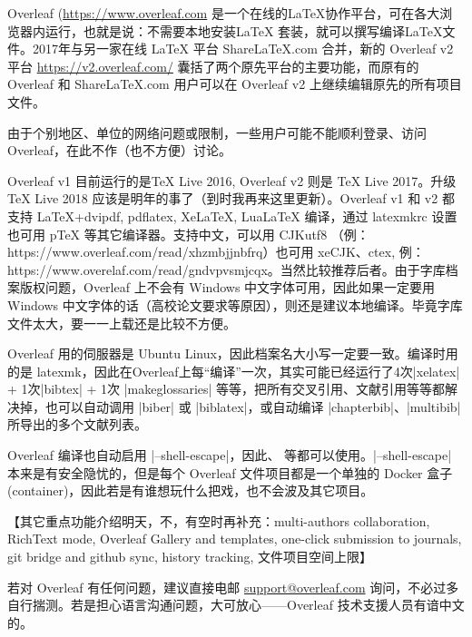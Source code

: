 


Overleaf (\url{https://www.overleaf.com} 是一个在线的LaTeX协作平台，可在各大浏览器内运行，也就是说：不需要本地安装LaTeX 套装，就可以撰写编译LaTeX文件。2017年与另一家在线 LaTeX 平台 ShareLaTeX.com 合并，新的 Overleaf v2 平台 \url{https://v2.overleaf.com/} 囊括了两个原先平台的主要功能，而原有的 Overleaf 和 ShareLaTeX.com 用户可以在 Overleaf v2 上继续编辑原先的所有项目文件。

由于个别地区、单位的网络问题或限制，一些用户可能不能顺利登录、访问 Overleaf，在此不作（也不方便）讨论。

Overleaf v1 目前运行的是TeX Live 2016, Overleaf v2 则是 TeX Live 2017。升级 TeX Live 2018 应该是明年的事了（到时我再来这里更新）。Overleaf v1 和 v2 都支持 LaTeX+dvipdf, pdflatex, XeLaTeX, LuaLaTeX 编译，通过 latexmkrc 设置也可用 pTeX 等其它编译器。支持中文，可以用 CJKutf8 （例：https://www.overleaf.com/read/xhzmbjjnbfrq）也可用 xeCJK、ctex, 例：https://www.overelaf.com/read/gndvpvsmjcqx。当然比较推荐后者。由于字库档案版权问题，Overleaf 上不会有 Windows 中文字体可用，因此如果一定要用 Windows 中文字体的话（高校论文要求等原因），则还是建议本地编译。毕竟字库文件太大，要一一上载还是比较不方便。

Overleaf 用的伺服器是 Ubuntu Linux，因此档案名大小写一定要一致。编译时用的是 latexmk，因此在Overleaf上每“编译”一次，其实可能已经运行了4次|xelatex| + 1次|bibtex| + 1次 |makeglossaries| 等等，把所有交叉引用、文献引用等等都解决掉，也可以自动调用 |biber| 或 |biblatex|，或自动编译 |chapterbib|、|multibib| 所导出的多个文献列表。

Overleaf 编译也自动启用 |--shell-escape|，因此、 等都可以使用。|--shell-escape| 本来是有安全隐忧的，但是每个 Overleaf 文件项目都是一个单独的 Docker 盒子 (container)，因此若是有谁想玩什么把戏，也不会波及其它项目。

【其它重点功能介绍明天，不，有空时再补充：multi-authors collaboration, RichText mode, Overleaf Gallery and templates, one-click submission to journals, git bridge and github sync, history tracking, 文件项目空间上限】

若对 Overleaf 有任何问题，建议直接电邮 \href{mailto:support@overleaf.com}{support@overleaf.com} 询问，不必过多自行揣测。若是担心语言沟通问题，大可放心——Overleaf 技术支援人员有谙中文的。

